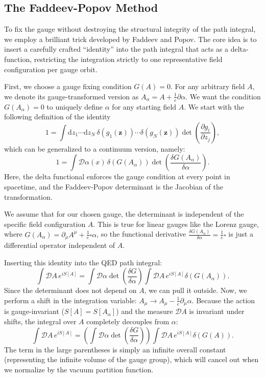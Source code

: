 \subsection{The Faddeev-Popov Method}
To fix the gauge without destroying the structural integrity of the path integral, we employ a brilliant trick developed by Faddeev and Popov. The core idea is to insert a carefully crafted ``identity'' into the path integral that acts as a delta-function, restricting the integration strictly to one representative field configuration per gauge orbit.

First, we choose a gauge fixing condition $G(A) = 0$. For any arbitrary field $A$, we denote its gauge-transformed version as $A_\alpha = A + \frac{1}{e} \partial \alpha$. We want the condition $G(A_\alpha) = 0$ to uniquely define $\alpha$ for any starting field $A$.
We start with the following definition of the identity
\[
    1 = \int \mathrm{d} z_1 \cdots \mathrm{d} z_N \, \delta(g_1(\mathbf{z})) \cdots \delta(g_N(\mathbf{z}))\det\left(\frac{\partial g_i}{\partial z_j}\right),
\]
which can be generalized to a continuum version, namely:
\[
    1 = \int \mathcal{D}\alpha(x) \, \delta(G(A_\alpha)) \det \left( \frac{\delta G(A_\alpha)}{\delta \alpha} \right).
\]
Here, the delta functional enforces the gauge condition at every point in spacetime, and the Faddeev-Popov determinant is the Jacobian of the transformation.

We assume that for our chosen gauge, the determinant is independent of the specific field configuration $A$. This is true for linear gauges like the Lorenz gauge, where $G(A_\alpha) = \partial_\mu A^\mu + \frac{1}{e} \square \alpha$, so the functional derivative $\frac{\delta G(A_\alpha)}{\delta \alpha} = \frac{1}{e} \square$ is just a differential operator independent of $A$.

Inserting this identity into the QED path integral:
\[
    \int \mathcal{D}A \, e^{iS[A]} = \int \mathcal{D}\alpha \det\left( \frac{\delta G}{\delta \alpha} \right) \int \mathcal{D}A \, e^{iS[A]} \delta(G(A_\alpha)).
\]
Since the determinant does not depend on $A$, we can pull it outside. Now, we perform a shift in the integration variable: $A_\mu \to A_\mu - \frac{1}{e}\partial_\mu \alpha$. Because the action is gauge-invariant ($S[A] = S[A_\alpha]$) and the measure $\mathcal{D}A$ is invariant under shifts, the integral over $A$ completely decouples from $\alpha$:
\[
    \int \mathcal{D}A \, e^{iS[A]} = \left( \int \mathcal{D}\alpha \det\left( \frac{\delta G}{\delta \alpha} \right) \right) \int \mathcal{D}A \, e^{iS[A]} \delta(G(A)).
\]
The term in the large parentheses is simply an infinite overall constant (representing the infinite volume of the gauge group), which will cancel out when we normalize by the vacuum partition function.


